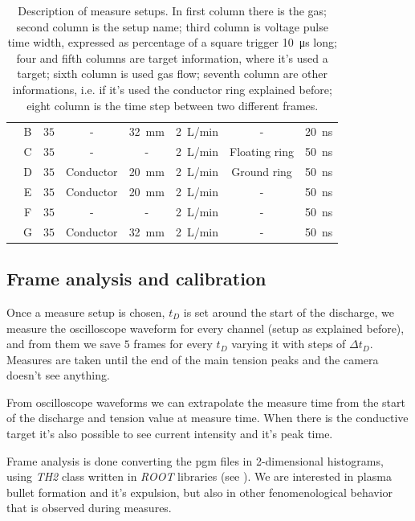 \begin{table}
\begin{tabular}{cccccccc}
                            &B  &$\num{35}$ &-  &\SI{32}{\milli\meter}  &\SI{2}{\liter/\minute} &-  &\SI{20}{\nano\second}\\
                            &C  &$\num{35}$ &-  &-  &\SI{2}{\liter/\minute} &Floating ring  &\SI{50}{\nano\second}\\
                            &D  &$\num{35}$ &Conductor  &\SI{20}{\milli\meter}  &\SI{2}{\liter/\minute} &Ground ring  &\SI{50}{\nano\second}\\
                            &E  &$\num{35}$ &Conductor  &\SI{20}{\milli\meter}  &\SI{2}{\liter/\minute} &-  &\SI{50}{\nano\second}\\
                            &F  &$\num{35}$ &-  &-  &\SI{2}{\liter/\minute} &-  &\SI{50}{\nano\second}\\
                            &G  &$\num{35}$ &Conductor  &\SI{32}{\milli\meter}  &\SI{2}{\liter/\minute} &-  &\SI{50}{\nano\second}\\
  \bottomrule
 \end{tabular}
 \caption{Description of measure setups. In first column there is the gas; second column is the setup name; third column is voltage pulse time width, expressed as percentage of a square trigger \SI{10}{\micro\second} long; four and fifth columns are target information, where it's used a target; sixth column is used gas flow; seventh column are other informations, i.e. if it's used the conductor ring explained before; eight column is the time step between two different frames.}
 \label{tab:setups}
\end{table}


\subsection{Frame analysis and calibration}
Once a measure setup is chosen, $t_D$ is set around the start of the discharge, we measure the oscilloscope waveform for every channel (setup as explained before), and from them we save $5$ frames for every $t_D$ varying it with steps of $\Delta t_D$. Measures are taken until the end of the main tension peaks and the camera doesn't see anything.


From oscilloscope waveforms we can extrapolate the measure time from the start of the discharge and tension value at measure time. When there is the conductive target it's also possible to see current intensity and it's peak time.


Frame analysis is done converting the pgm files in 2-dimensional histograms, using \emph{TH2} class written in \emph{ROOT} libraries (see \cite{ROOT:TH2}).
We are interested in plasma bullet formation and it's expulsion, but also in other fenomenological behavior that is observed during measures.

